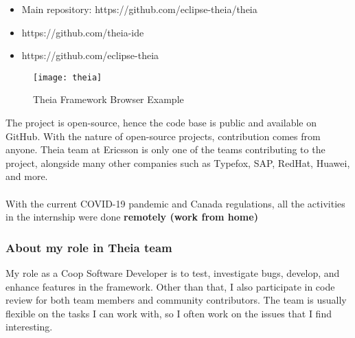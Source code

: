 \begin{itemize}
    \item Main repository: https://github.com/eclipse-theia/theia
    \item https://github.com/theia-ide 
    \item https://github.com/eclipse-theia
\end{itemize}

\begin{figure}[h]
    \texttt{[image: theia]}
    \caption{Theia Framework Browser Example}
\centering
\end{figure}

The project is open-source, hence the code base is public and available on GitHub.
With the nature of open-source projects, contribution comes from anyone.
Theia team at Ericsson is only one of the teams contributing to the project, alongside many other companies such as Typefox, SAP, RedHat, Huawei, and more.
\\
\\
With the current COVID-19 pandemic and Canada regulations, all the activities in the internship were done \textbf{remotely (work from home) }

\newpage
\subsubsection{About my role in Theia team}
My role as a Coop Software Developer is to test, investigate bugs, develop, and enhance features in the framework.
Other than that, I also participate in code review for both team members and community contributors.
The team is usually flexible on the tasks I can work with, so I often work on the issues that I find interesting.

